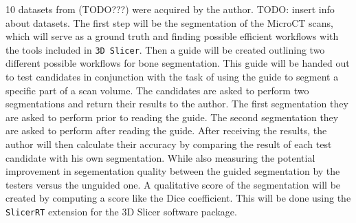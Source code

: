 10 datasets from (TODO???) were acquired by the author.
TODO: insert info about datasets.
\newline
\noindent
The first step will be the segmentation of the MicroCT scans, which will serve as a ground truth and finding possible efficient workflows with the tools included in \texttt{3D Slicer}.
Then a guide will be created outlining two different possible workflows for bone segmentation.
This guide will be handed out to test candidates in conjunction with the task of using the guide to segment a specific part of a scan volume.
The candidates are asked to perform two segmentations and return their results to the author.
The first segmentation they are asked to perform prior to reading the guide.
The second segmentation they are asked to perform after reading the guide.
After receiving the results, the author will then calculate their accuracy by comparing the result of each test candidate with his own segmentation.
While also measuring the potential improvement in segementation quality between the guided segmentation by the testers versus the unguided one.
A qualitative score of the segmentation will be created by computing a score like the Dice coefficient\cite{diceMeasuresAmountEcologic1945}.
This will be done using the \texttt{SlicerRT}\cite{pinterSlicerRTRadiationTherapy2012} extension for the 3D Slicer software package.





